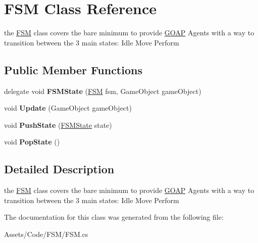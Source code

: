\hypertarget{class_f_s_m}{}\section{F\+S\+M Class Reference}
\label{class_f_s_m}


the \hyperlink{class_f_s_m}{F\+S\+M} class covers the bare minimum to provide \hyperlink{class_g_o_a_p}{G\+O\+A\+P} Agents with a way to transition between the 3 main states\+: Idle Move Perform  


\subsection*{Public Member Functions}
\begin{DoxyCompactItemize}
\item 
\hypertarget{class_f_s_m_a7c92cc5309ca4f83c8f7984579901996}{}delegate void {\bfseries F\+S\+M\+State} (\hyperlink{class_f_s_m}{F\+S\+M} fsm, Game\+Object game\+Object)\label{class_f_s_m_a7c92cc5309ca4f83c8f7984579901996}

\item 
\hypertarget{class_f_s_m_a5d544e5c245b1b90b78eb5b2951ba1da}{}void {\bfseries Update} (Game\+Object game\+Object)\label{class_f_s_m_a5d544e5c245b1b90b78eb5b2951ba1da}

\item 
\hypertarget{class_f_s_m_a150457bcd1fce2077d7260a46de403b2}{}void {\bfseries Push\+State} (\hyperlink{interface_f_s_m_state}{F\+S\+M\+State} state)\label{class_f_s_m_a150457bcd1fce2077d7260a46de403b2}

\item 
\hypertarget{class_f_s_m_af3ecd111eb7f58a2817e1e23960b6e58}{}void {\bfseries Pop\+State} ()\label{class_f_s_m_af3ecd111eb7f58a2817e1e23960b6e58}

\end{DoxyCompactItemize}


\subsection{Detailed Description}
the \hyperlink{class_f_s_m}{F\+S\+M} class covers the bare minimum to provide \hyperlink{class_g_o_a_p}{G\+O\+A\+P} Agents with a way to transition between the 3 main states\+: Idle Move Perform 



The documentation for this class was generated from the following file\+:\begin{DoxyCompactItemize}
\item 
Assets/\+Code/\+F\+S\+M/F\+S\+M.\+cs\end{DoxyCompactItemize}
